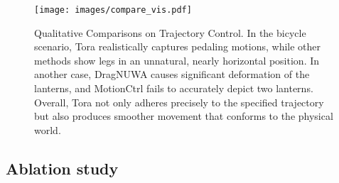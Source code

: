 
\begin{figure}[!t]
    \centering
    \texttt{[image: images/compare\_vis.pdf]}
    \caption{
        Qualitative Comparisons on Trajectory Control. 
        In the bicycle scenario, Tora realistically captures pedaling motions, while other methods show legs in an unnatural, nearly horizontal position. In another case, DragNUWA causes significant deformation of the lanterns, and MotionCtrl fails to accurately depict two lanterns. Overall, Tora not only adheres precisely to the specified trajectory but also produces smoother movement that conforms to the physical world. 
    }
    \label{fig:6}   
    \vspace{-2mm}
\end{figure}





\subsection{Ablation study}




